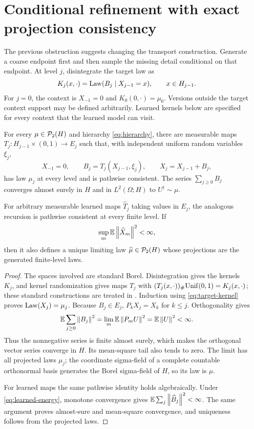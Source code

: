 \section{Conditional refinement with exact projection consistency}\label{sec:refinement}
The previous obstruction suggests changing the transport construction. Generate a coarse endpoint first and then sample the missing detail conditional on that endpoint. At level $j$, disintegrate the target law as
\begin{equation}\label{eq:target-kernel}
 K_j(x,\cdot)=\operatorname{Law}(B_j\mid X_{j-1}=x),\qquad x\in H_{j-1}.
\end{equation}
For $j=0$, the context is $X_{-1}=0$ and $K_0(0,\cdot)=\mu_0$. Versions outside the target context support may be defined arbitrarily. Learned kernels below are specified for every context that the learned model can visit.

\begin{theorem}\label{thm:representation}
For every $\mu\in\mathcal P_2(H)$ and hierarchy \eqref{eq:hierarchy}, there are measurable maps $T_j:H_{j-1}\times(0,1)\to E_j$ such that, with independent uniform random variables $\xi_j$,
\begin{equation}\label{eq:tower}
 X_{-1}=0,\qquad B_j=T_j(X_{j-1},\xi_j),\qquad X_j=X_{j-1}+B_j,
\end{equation}
has law $\mu_j$ at every level and is pathwise consistent. The series $\sum_{j\ge0}B_j$ converges almost surely in $H$ and in $L^2(\Omega;H)$ to $U^\dagger\sim\mu$.

For arbitrary measurable learned maps $\widehat T_j$ taking values in $E_j$, the analogous recursion is pathwise consistent at every finite level. If
\begin{equation}\label{eq:learned-energy}
 \sup_m\mathbb E\left\lVert\widehat X_m\right\rVert^2<\infty,
\end{equation}
then it also defines a unique limiting law $\widehat\mu\in\mathcal P_2(H)$ whose projections are the generated finite-level laws.
\end{theorem}
\begin{proof}
The spaces involved are standard Borel. Disintegration gives the kernels $K_j$, and kernel randomization gives maps $T_j$ with $(T_j(x,\cdot))_{\#}\mathrm{Unif}(0,1)=K_j(x,\cdot)$; these standard constructions are treated in \citet{kallenberg2021}. Induction using \eqref{eq:target-kernel} proves $\operatorname{Law}(X_j)=\mu_j$. Because $B_j\in E_j$, $P_kX_j=X_k$ for $k\le j$. Orthogonality gives
\[
 \mathbb E\sum_{j\ge0}\left\lVert B_j\right\rVert^2
 =\lim_m\mathbb E\left\lVert P_mU\right\rVert^2=\mathbb E\left\lVert U\right\rVert^2<\infty.
\]
Thus the nonnegative series is finite almost surely, which makes the orthogonal vector series converge in $H$. Its mean-square tail also tends to zero. The limit has all projected laws $\mu_j$; the coordinate sigma-field of a complete countable orthonormal basis generates the Borel sigma-field of $H$, so its law is $\mu$.

For learned maps the same pathwise identity holds algebraically. Under \eqref{eq:learned-energy}, monotone convergence gives $\mathbb E\sum_j\left\lVert\widehat B_j\right\rVert^2<\infty$. The same argument proves almost-sure and mean-square convergence, and uniqueness follows from the projected laws.
\end{proof}

